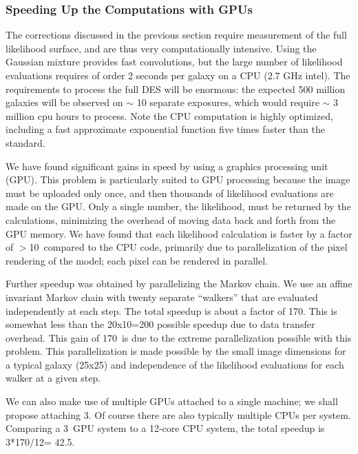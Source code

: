 \documentclass[12pt]{article}
\newcommand{\speedupnum}{10}
\newcommand{\ncpus}{12}
\newcommand{\speedupcpu}{42.5}
\newcommand{\overallspeedup}{170}
\newcommand{\ngpus}{3}
\begin{document}
\subsubsection{Speeding Up the Computations with GPUs} \label{sec:gmix:gpu}

The corrections discussed in the previous section require measurement of the
full likelihood surface, and are thus very computationally intensive.  Using
the Gaussian mixture provides fast convolutions, but the large number of
likelihood evaluations requires of order 2 seconds per galaxy on a CPU (2.7 GHz
intel). The requirements to process the full DES will be enormous: the expected
500 million galaxies will be observed on $\sim$ 10 separate exposures, which
would require $\sim$ 3 million cpu hours to process. Note the CPU computation
is highly optimized, including a fast approximate exponential function five
times faster than the standard. 

We have found significant gains in speed by using a graphics processing unit
(GPU).  This problem is particularly suited to GPU processing because the image
must be uploaded only once, and then thousands of likelihood evaluations are
made on the GPU. Only a single number, the likelihood, must be returned by the
calculations, minimizing the overhead of moving data back and forth from the
GPU memory.  We have found that each likelihood calculation is faster by a
factor of $>$\speedupnum\ compared to the CPU code, primarily due to
parallelization of the pixel rendering of the model; each pixel can be rendered
in parallel.

Further speedup was obtained by parallelizing the Markov chain.  We use an
affine invariant Markov chain\cite{GoodmanWeare10} with twenty separate
``walkers'' that are evaluated independently at each step.  The total speedup
is about a factor of \overallspeedup.  This is somewhat less than the 20x10=200
possible speedup due to data transfer overhead.  This gain of \overallspeedup\
is due to the extreme parallelization possible with this problem.  This
parallelization is made possible by the small image dimensions for a typical
galaxy (25x25) and independence of the likelihood evaluations for each walker
at a given step.

We can also make use of multiple GPUs attached to a single machine; we shall
propose attaching \ngpus.  Of course there are also typically multiple CPUs per
system.  Comparing a \ngpus\ GPU system to a \ncpus-core CPU system, the total
speedup is \ngpus*\overallspeedup/\ncpus = \speedupcpu.
\end{document}
